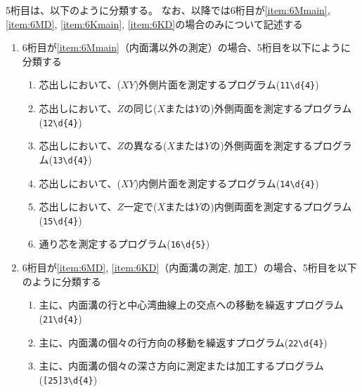 5桁目は、以下のように分類する。
なお、以降では6桁目が\ref{item:6Mmain}, \ref{item:6MD}, \ref{item:6Kmain}, \ref{item:6KD}の場合のみについて記述する
\begin{enumerate}[label=\alph*)]
\item 6桁目が\ref{item:6Mmain}（内面溝以外の測定）の場合、5桁目を以下にように分類する
  \begin{enumerate}[label=\arabic*., ref=\arabic*, start=1]
  \item\label{item:5MCOO} 芯出しにおいて、($XY$)外側片面を測定するプログラム(\verb|11\d{4}|)
  \item\label{item:5MCOBsZ} 芯出しにおいて、$Z$の同じ($X$または$Y$の)外側両面を測定するプログラム(\verb|12\d{4}|)
  \item\label{item:5MCOBdZ} 芯出しにおいて、$Z$の異なる($X$または$Y$の)外側両面を測定するプログラム(\verb|13\d{4}|)
  \item\label{item:5MCIO} 芯出しにおいて、($XY$)内側片面を測定するプログラム(\verb|14\d{4}|)
  \item\label{item:5MCIB} 芯出しにおいて、$Z$一定で($X$または$Y$の)内側両面を測定するプログラム(\verb|15\d{4}|)
  \item\label{item:5MCL} 通り芯を測定するプログラム(\verb|16\d{5}|)
  \end{enumerate}
\item 6桁目が\ref{item:6MD}, \ref{item:6KD}（内面溝の測定, 加工）の場合、5桁目を以下のように分類する
  \begin{enumerate}[label=\arabic*., ref=\arabic*]
  \item 主に、内面溝の行と中心湾曲線上の交点への移動を繰返すプログラム(\verb|21\d{4}|)
  \item 主に、内面溝の個々の行方向の移動を繰返すプログラム(\verb|22\d{4}|)
  \item 主に、内面溝の個々の深さ方向に測定または加工するプログラム(\verb|[25]3\d{4}|)
  \end{enumerate}

\end{enumerate}
